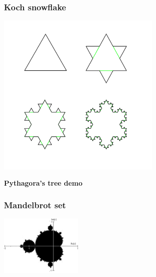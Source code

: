 \documentclass[9pt]{beamer}
\begin{document}
\begin{frame}
  \frametitle{Koch snowflake}

  \begin{center}
    \includegraphics[width = 8cm]{images/koch_building.png}
  \end{center}


\end{frame}



\begin{frame}
  \begin{center}
    {\Huge \bf{Pythagora's tree demo}}
  \end{center}
\end{frame}

\begin{frame}
  \frametitle{Mandelbrot set}

  \begin{center}
    \includegraphics[width = 4cm]{images/mandelbrot_simple.png}
  \end{center}
\end{frame}
\end{document}
